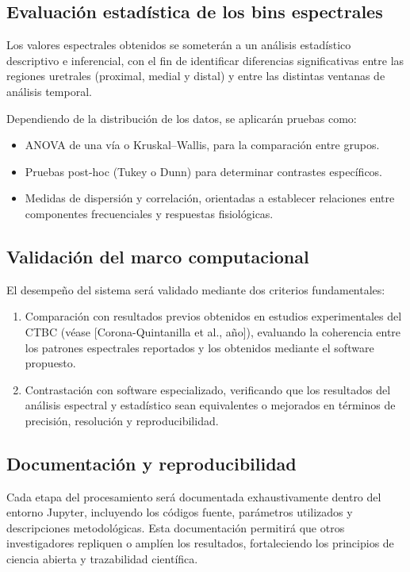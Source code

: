 \subsection{Evaluación estadística de los bins espectrales}

Los valores espectrales obtenidos se someterán a un análisis estadístico descriptivo e inferencial, con el fin de identificar diferencias significativas entre las regiones uretrales (proximal, medial y distal) y entre las distintas ventanas de análisis temporal.

Dependiendo de la distribución de los datos, se aplicarán pruebas como:

\begin{itemize}
	\item ANOVA de una vía o Kruskal–Wallis, para la comparación entre grupos.
	\item Pruebas post-hoc (Tukey o Dunn) para determinar contrastes específicos.
	\item Medidas de dispersión y correlación, orientadas a establecer relaciones entre componentes frecuenciales y respuestas fisiológicas.
\end{itemize}

\subsection{Validación del marco computacional}
El desempeño del sistema será validado mediante dos criterios fundamentales:

\begin{enumerate}
	\item Comparación con resultados previos obtenidos en estudios experimentales del CTBC (véase [Corona-Quintanilla et al., año]), evaluando la coherencia entre los patrones espectrales reportados y los obtenidos mediante el software propuesto.
	\item Contrastación con software especializado, verificando que los resultados del análisis espectral y estadístico sean equivalentes o mejorados en términos de precisión, resolución y reproducibilidad.
\end{enumerate}

\subsection{Documentación y reproducibilidad}

Cada etapa del procesamiento será documentada exhaustivamente dentro del entorno Jupyter, incluyendo los códigos fuente, parámetros utilizados y descripciones metodológicas. Esta documentación permitirá que otros investigadores repliquen o amplíen los resultados, fortaleciendo los principios de ciencia abierta y trazabilidad científica.

